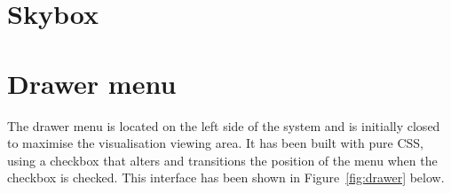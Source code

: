 \section{Skybox} {
\label{sec:skybox}


}

\section{Drawer menu} {
\label{sec:drawer}

	The drawer menu is located on the left side of the system and is initially closed to maximise the visualisation viewing area. It has been built with pure CSS, using a checkbox that alters and transitions the position of the menu when the checkbox is checked. This interface has been shown in Figure~\ref{fig:drawer} below.

	

}

